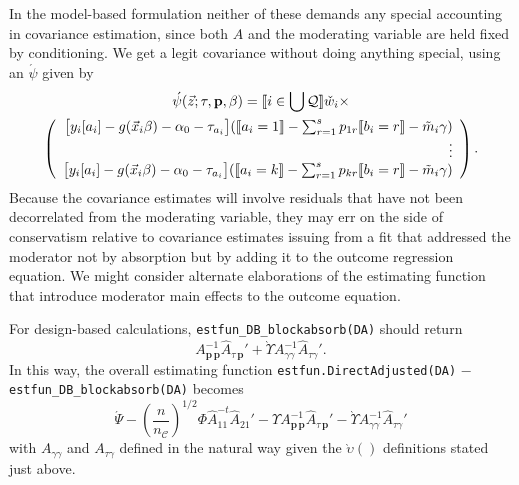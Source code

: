\documentclass{article}
\DeclarePairedDelimiter{\indicator}{\llbracket}{\rrbracket}
\newcommand{\owt}[1][{[a_i]}]{\ensuremath{\check{w}_{i#1}}}
\newcommand{\AbsorbInterceptsEF}{\Upsilon}
\newcommand{\absorbModeratorEF}{\grave{\upsilon}}
\newcommand{\AbsorbModeratorEF}{\grave{\Upsilon}}
\begin{document}
In the model-based formulation neither of these demands any special
accounting in covariance estimation, since both $A$ and the moderating
variable are held fixed by conditioning. We get a legit covariance
without doing anything special, using an $\acute{\psi}$ given by
\begin{multline*}
  \acute{\psi}(\vec{z}; \tau, \mathbf{p}, \beta) =
    \indicator{i \in \bigcup \mathcal{Q}}\owt[] \times \\
\left(
  \begin{array}{r}
    \big[y_{i}[a_{i}]
    -
    g(\vec{x}_{i}\beta)-\alpha_{0}-\tau_{a_{i}}\big]
    (
    \indicator{a_{i}=1}-
    \sum_{r=1}^{s}p_{1r}\indicator{b_{i}=r}
    - \tilde{m}_{i}\gamma)\\
    \vdots \\
    {}\big[y_{i}[a_{i}]
    - g(\vec{x}_{i}\beta) -\alpha_{0} -
    \tau_{a_{i}}\big]
    (
    \indicator{a_{i}=k}
    -
    \sum_{r=1}^{s}p_{kr}\indicator{b_{i}=r}
    -
    \tilde{m}_{i}\gamma)\\
  \end{array}
\right) .
\end{multline*}
Because the covariance estimates will
involve residuals that have not been decorrelated from the moderating
variable, they may err on the side of conservatism relative to
covariance estimates issuing from a fit that addressed the moderator
not by absorption but by adding it to the outcome regression
equation. We might consider alternate elaborations of the estimating
function that introduce moderator main effects to the outcome equation.

For design-based calculations, \texttt{estfun\_DB\_blockabsorb(DA)}
 should return
 \begin{equation*}
   A_{\mathbf{p}\,\mathbf{p}}^{-1}\hat{A}_{\tau\,\mathbf{p}}' +
  \AbsorbModeratorEF{}A_{\gamma \gamma}^{-1}\hat{A}_{\tau \gamma}'.
 \end{equation*}
 In this way, the overall estimating function
 \texttt{estfun.DirectAdjusted(DA)} $-$ \texttt{estfun\_DB\_blockabsorb(DA)} 
 becomes
 \begin{equation}
   \label{eq:19}
  \acute{\Psi} -
  \left(\frac{n}{n_{\mathcal{C}}}\right)^{1/2}\Phi
  \hat{A}_{11}^{-t}\hat{A}_{21}' - \AbsorbInterceptsEF{}
  A_{\mathbf{p}\,\mathbf{p}}^{-1}\hat{A}_{\tau\,\mathbf{p}}' -
  \AbsorbModeratorEF{}A_{\gamma \gamma}^{-1}\hat{A}_{\tau \gamma}'
 \end{equation}
with $A_{\gamma \gamma}$ and $A_{\tau \gamma}$ defined in the natural
way given the $\absorbModeratorEF()$ definitions stated just above. 
\end{document}
